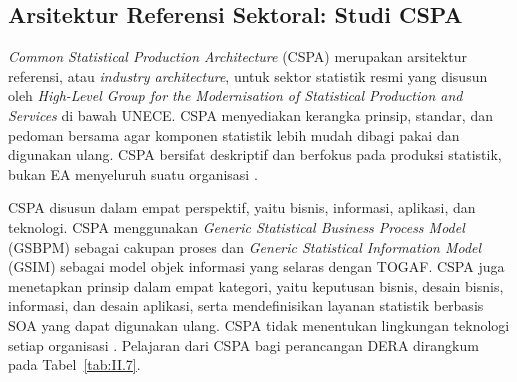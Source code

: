 \subsection{Arsitektur Referensi Sektoral: Studi CSPA}
\label{sec:II.6.6}

\textit{Common Statistical Production Architecture} (CSPA) merupakan arsitektur referensi, atau \textit{industry architecture}, untuk sektor statistik resmi yang disusun oleh \textit{High-Level Group for the Modernisation of Statistical Production and Services} di bawah UNECE\label{sk:UNECE}. CSPA menyediakan kerangka prinsip, standar, dan pedoman bersama agar komponen statistik lebih mudah dibagi pakai dan digunakan ulang. CSPA bersifat deskriptif dan berfokus pada produksi statistik, bukan EA menyeluruh suatu organisasi \cite{UNECECSPA2014}.

CSPA disusun dalam empat perspektif, yaitu bisnis, informasi, aplikasi, dan teknologi. CSPA menggunakan \textit{Generic Statistical Business Process Model} (GSBPM\label{sk:GSBPM}) sebagai cakupan proses dan \textit{Generic Statistical Information Model} (GSIM\label{sk:GSIM}) sebagai model objek informasi yang selaras dengan TOGAF. CSPA juga menetapkan prinsip dalam empat kategori, yaitu keputusan bisnis, desain bisnis, informasi, dan desain aplikasi, serta mendefinisikan layanan statistik berbasis SOA\label{sk:SOA} yang dapat digunakan ulang. CSPA tidak menentukan lingkungan teknologi setiap organisasi \cite{UNECECSPA2014}. Pelajaran dari CSPA bagi perancangan DERA dirangkum pada Tabel~\ref{tab:II.7}.


